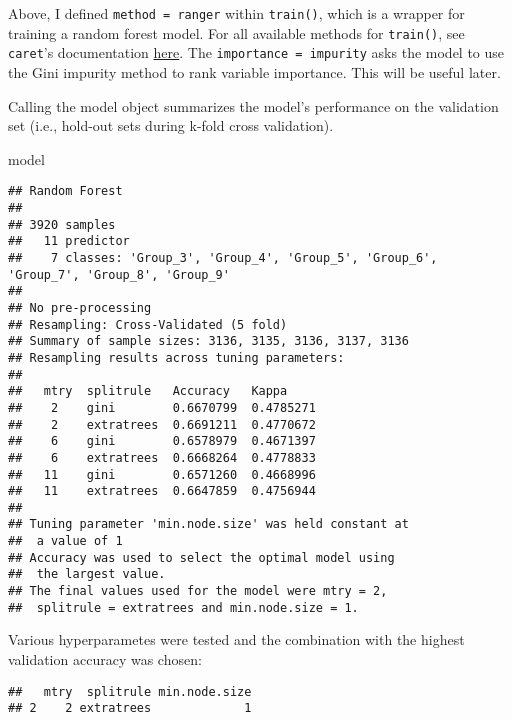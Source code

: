\documentclass[
]{book}
\newenvironment{Shaded}{\begin{snugshade}}{\end{snugshade}}
\newcommand{\NormalTok}[1]{#1}
\newcommand{\SpecialCharTok}[1]{\textcolor[rgb]{0.00,0.00,0.00}{#1}}
\begin{document}
Above, I defined \texttt{method\ =\ ranger} within \texttt{train()}, which is a wrapper for training a random forest model. For all available methods for \texttt{train()}, see \texttt{caret}'s documentation \href{https://topepo.github.io/caret/train-models-by-tag.html}{here}. The \texttt{importance\ =\ \textquotesingle{}impurity\textquotesingle{}} asks the model to use the Gini impurity method to rank variable importance. This will be useful later.

Calling the model object summarizes the model's performance on the validation set (i.e., hold-out sets during k-fold cross validation).

\begin{Shaded}
\begin{Highlighting}[]
\NormalTok{model}
\end{Highlighting}
\end{Shaded}

\begin{verbatim}
## Random Forest 
## 
## 3920 samples
##   11 predictor
##    7 classes: 'Group_3', 'Group_4', 'Group_5', 'Group_6', 'Group_7', 'Group_8', 'Group_9' 
## 
## No pre-processing
## Resampling: Cross-Validated (5 fold) 
## Summary of sample sizes: 3136, 3135, 3136, 3137, 3136 
## Resampling results across tuning parameters:
## 
##   mtry  splitrule   Accuracy   Kappa    
##    2    gini        0.6670799  0.4785271
##    2    extratrees  0.6691211  0.4770672
##    6    gini        0.6578979  0.4671397
##    6    extratrees  0.6668264  0.4778833
##   11    gini        0.6571260  0.4668996
##   11    extratrees  0.6647859  0.4756944
## 
## Tuning parameter 'min.node.size' was held constant at
##  a value of 1
## Accuracy was used to select the optimal model using
##  the largest value.
## The final values used for the model were mtry = 2,
##  splitrule = extratrees and min.node.size = 1.
\end{verbatim}

Various hyperparametes were tested and the combination with the highest validation accuracy was chosen:

\begin{Shaded}
\end{Shaded}

\begin{verbatim}
##   mtry  splitrule min.node.size
## 2    2 extratrees             1
\end{verbatim}
\end{document}
